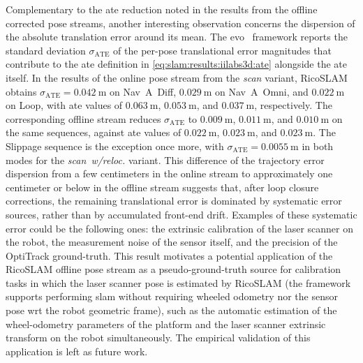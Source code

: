 Complementary to the \gls{ate} reduction noted in the results from the
offline corrected pose streams, another interesting observation concerns
the dispersion of the absolute translation error around its mean.
The evo~\cite{grupp:evo} framework reports the standard deviation $\sigma_{\mathrm{ATE}}$
of the per-pose translational error magnitudes that contribute to the \gls{ate}
definition in \eqref{eq:slam:results:iilabs3d:ate} alongside the \gls{ate}
itself. In the results of the online pose stream from the \emph{scan} variant,
RicoSLAM obtains $\sigma_{\mathrm{ATE}} = \SI{0.042}{\metre}$ on Nav~A~Diff,
$\SI{0.029}{\metre}$ on Nav~A~Omni, and $\SI{0.022}{\metre}$ on
Loop, with \gls{ate} values of $\SI{0.063}{\metre}$,
$\SI{0.053}{\metre}$, and $\SI{0.037}{\metre}$, respectively.
The corresponding offline stream reduces $\sigma_{\mathrm{ATE}}$ to
$\SI{0.009}{\metre}$, $\SI{0.011}{\metre}$, and $\SI{0.010}{\metre}$
on the same sequences, against \gls{ate} values of
$\SI{0.022}{\metre}$, $\SI{0.023}{\metre}$, and $\SI{0.023}{\metre}$.
The Slippage sequence is the exception once more, with
$\sigma_{\mathrm{ATE}} = \SI{0.0055}{\metre}$ in both modes for the
\emph{scan~w/reloc.} variant.
This difference of the trajectory error dispersion from a few centimeters in
the online stream to approximately one centimeter or below in
the offline stream suggests that, after loop closure corrections,
the remaining translational error is dominated by systematic error sources,
rather than by accumulated front-end drift.
Examples of these systematic error could be the following ones:
the extrinsic calibration of the laser scanner on the robot,
the measurement noise of the sensor itself, and the precision of
the OptiTrack ground-truth. This result motivates a potential application of
the RicoSLAM offline pose stream as a pseudo-ground-truth source for calibration
tasks in which the laser scanner pose is estimated by RicoSLAM
(the framework supports performing \gls{slam} without requiring wheeled odometry
nor the sensor pose \gls{wrt} the robot geometric frame), such as the
automatic estimation of the wheel-odometry parameters of the platform
and the laser scanner extrinsic transform on the robot simultaneously.
The empirical validation of this application is left as future work.

